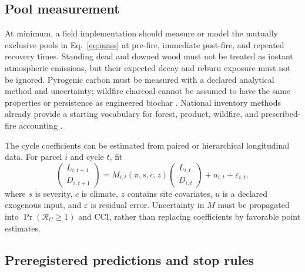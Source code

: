 \documentclass[10pt]{article}
\newcommand{\RC}{\mathcal{R}_{\!C}}
\begin{document}
\subsection{Pool measurement}

At minimum, a field implementation should measure or model the mutually
exclusive pools in Eq.~\eqref{eq:mass} at pre-fire, immediate post-fire, and
repeated recovery times.  Standing dead and downed wood must not be treated as
instant atmospheric emissions, but their expected decay and reburn exposure
must not be ignored.  Pyrogenic carbon must be measured with a declared
analytical method and uncertainty; wildfire charcoal cannot be assumed to have
the same properties or persistence as engineered biochar \cite{santin2016,
lehmann2021}.  National inventory methods already provide a starting vocabulary
for forest, product, wildfire, and prescribed-fire accounting
\cite{usda2024}.

The cycle coefficients can be estimated from paired or hierarchical
longitudinal data.  For parcel $i$ and cycle $t$, fit
\begin{equation}
\begin{pmatrix}L_{i,t+1}\\D_{i,t+1}\end{pmatrix}
=M_{i,t}(\pi,s,c,z)
\begin{pmatrix}L_{i,t}\\D_{i,t}\end{pmatrix}+u_{i,t}+\varepsilon_{i,t},
\label{eq:empirical}
\end{equation}
where $s$ is severity, $c$ is climate, $z$ contains site covariates, $u$ is a
declared exogenous input, and $\varepsilon$ is residual error.  Uncertainty in
$M$ must be propagated into $\Pr(\RC\ge1)$ and CCI, rather than replacing
coefficients by favorable point estimates.

\subsection{Preregistered predictions and stop rules}
\end{document}
